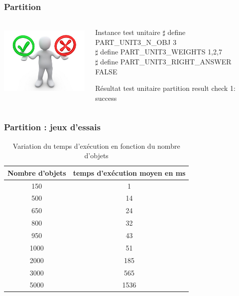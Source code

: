 \documentclass[french]{beamer}
\begin{document}
\begin{frame}
  \frametitle{Partition}
  \begin{columns}
    \begin{column}[]{4cm}
      \begin{center}
        \includegraphics[height=3.5cm]{unitest.jpg}
      \end{center}
    \end{column}
      \begin{column}[]{6cm}
        \begin{block}{Instance test unitaire}
$\sharp$ define PART\_UNIT3\_N\_OBJ 3 \\
$\sharp$ define PART\_UNIT3\_WEIGHTS {1,2,7} \\
$\sharp$ define PART\_UNIT3\_RIGHT\_ANSWER FALSE \\

        \end{block}
        \begin{block}{Résultat test unitaire}
          partition result check 1: success
        \end{block}
      \end{column}
    \end{columns}
  \end{frame}
  
  \begin{frame}
    \frametitle{Partition : jeux d'essais}

\begin{table}[h!]
\centering
\begin{tabular}{|c|c|}
\hline
Nombre d'objets & temps d'exécution moyen en ms\\
\hline
150 & 1\\
\hline
500 & 14\\
\hline
650 & 24\\
\hline
800 & 32\\
\hline
950 & 43\\
\hline
1000 & 51\\
\hline
2000 & 185\\
\hline
3000 & 565\\
\hline
5000 & 1536\\
\hline
\end{tabular}
\caption {Variation du temps d'exécution en fonction du nombre d'objets}
\end{table}
\end{frame}
\end{document}
